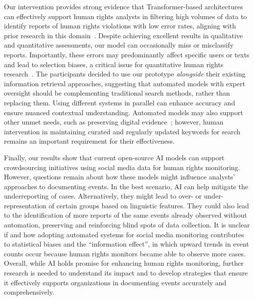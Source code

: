 \documentclass[11pt,letterpaper]{article}
\begin{document}
Our intervention provides strong evidence that Transformer-based architectures can effectively support human rights analysts in filtering high volumes of data to identify reports of human rights violations with low error rates, aligning with prior research in this domain~\citep{nemkovaDetectingHumanRights2023,alhelbawyNLPPoweredHumanRights2020}. Despite achieving excellent results in qualitative and quantitative assessments, our model can occasionally miss or misclassify reports. Importantly, these errors may predominantly affect specific users or texts and lead to selection biases, a critical issue for quantitative human rights research~\citep{price_selection_2015}. The participants decided to use our prototype \emph{alongside} their existing information retrieval approaches, suggesting that automated models with expert oversight should be complementing traditional search methods, rather than replacing them. Using different systems in parallel can enhance accuracy and ensure nuanced contextual understanding. Automated models may also support other unmet needs, such as preserving digital evidence~\citep{mooneySocialMediaEvidence2021}; however, human intervention in maintaining curated and regularly updated keywords for search~\citep{myersHowConductDiscovery2020} remains an important requirement for their effectiveness.

Finally, our results show that current open-source AI models can support crowdsourcing initiatives using social media data for human rights monitoring. However, questions remain about how these models might influence analysts' approaches to documenting events. In the best scenario, AI can help mitigate the underreporting of cases. Alternatively, they might lead to over- or under-representation of certain groups based on linguistic features. They could also lead to the identification of more reports of the same events already observed without automation, preserving and reinforcing blind spots of data collection. It is unclear if and how adopting automated systems for social media monitoring contributes to statistical biases and the ``information effect”\cite{greeneMachineLearningHuman2019,clarkInformationEffectsHuman2013}, in which upward trends in event counts occur because human rights monitors became able to observe more cases. Overall, while AI holds promise for enhancing human rights monitoring, further research is needed to understand its impact and to develop strategies that ensure it effectively supports organizations in documenting events accurately and comprehensively.
\end{document}
